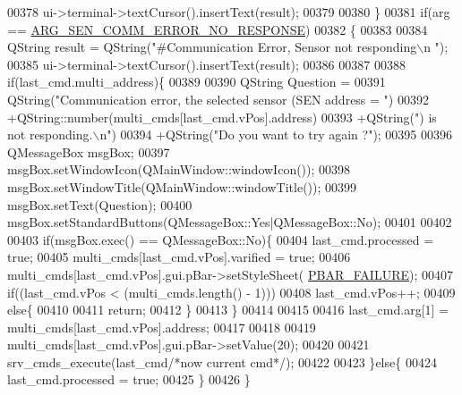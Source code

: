 \begin{DoxyCode}
{{{{{{{{{{{{{{{{00378                 ui->terminal->textCursor().insertText(result);
00379 
00380        \}
00381        \textcolor{keywordflow}{if}(arg == \hyperlink{a00090_a5f745a08fe4d5a8336a8fd62c30e0642}{ARG\_SEN\_COMM\_ERROR\_NO\_RESPONSE})
00382        \{
00383 
00384             QString result =  QString(\textcolor{stringliteral}{"#Communication Error, Sensor not responding\(\backslash\)n "});
00385             ui->terminal->textCursor().insertText(result);
00386 
00387 
00388                 \textcolor{keywordflow}{if}(last\_cmd.multi\_address)\{
00389 
00390                     QString Question =
00391                             QString(\textcolor{stringliteral}{"Communication error, the selected sensor (SEN address = "})
00392                             +QString::number(multi\_cmds[last\_cmd.vPos].address)
00393                             +QString(\textcolor{stringliteral}{") is not responding.\(\backslash\)n"})
00394                             +QString(\textcolor{stringliteral}{"Do you want to try again ?"});
00395 
00396                     QMessageBox msgBox;
00397                     msgBox.setWindowIcon(QMainWindow::windowIcon());
00398                     msgBox.setWindowTitle(QMainWindow::windowTitle());
00399                     msgBox.setText(Question);
00400                     msgBox.setStandardButtons(QMessageBox::Yes|QMessageBox::No);
00401 
00402 
00403                     \textcolor{keywordflow}{if}(msgBox.exec() == QMessageBox::No)\{
00404                     last\_cmd.processed = \textcolor{keyword}{true};
00405                     multi\_cmds[last\_cmd.vPos].varified = \textcolor{keyword}{true};
00406                     multi\_cmds[last\_cmd.vPos].gui.pBar->setStyleSheet(
      \hyperlink{a00090_aa9f43b2774395af6510910f8feed7cb4}{PBAR\_FAILURE});
00407                     \textcolor{keywordflow}{if}((last\_cmd.vPos < (multi\_cmds.length() - 1)))
00408                         last\_cmd.vPos++;
00409                     \textcolor{keywordflow}{else}\{
00410 
00411                         \textcolor{keywordflow}{return};
00412                      \}
00413                     \}
00414 
00415 
00416                     last\_cmd.arg[1] = multi\_cmds[last\_cmd.vPos].address;
00417 
00418 
00419                     multi\_cmds[last\_cmd.vPos].gui.pBar->setValue(20);
00420 
00421                     srv\_cmds\_execute(last\_cmd\textcolor{comment}{/*now current cmd*/});
00422 
00423                 \}\textcolor{keywordflow}{else}\{
00424                     last\_cmd.processed = \textcolor{keyword}{true};
00425                 \}
00426         \}
}}}}}}}}}}}}}}}}
\end{DoxyCode}
